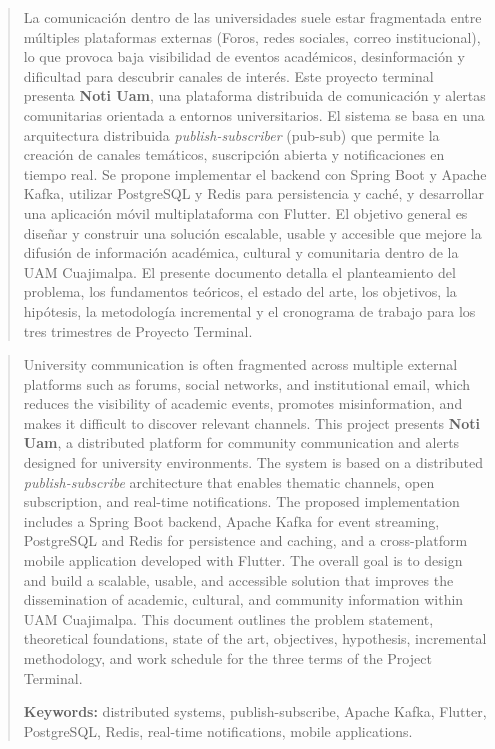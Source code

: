 \documentclass[11pt,spanish]{article}
\begin{document}
\pagestyle{empty}
\vfill
\begin{abstract}
La comunicación dentro de las universidades suele estar fragmentada entre múltiples plataformas externas 
(Foros, redes sociales, correo institucional), lo que provoca baja visibilidad de eventos académicos, 
desinformación y dificultad para descubrir canales de interés. Este proyecto terminal presenta \textbf{Noti Uam}, 
una plataforma distribuida de comunicación y alertas comunitarias orientada a entornos universitarios.
 El sistema se basa en una arquitectura distribuida \textit{publish-subscriber} (pub-sub) que permite la creación de 
 canales temáticos, suscripción abierta y notificaciones en tiempo real. Se propone implementar el backend con 
 Spring Boot y Apache Kafka, utilizar PostgreSQL y Redis para persistencia y caché, y desarrollar una aplicación 
 móvil multiplataforma con Flutter. El objetivo general es diseñar y construir una solución escalable, usable y 
 accesible que mejore la difusión de información académica, cultural y comunitaria dentro de la UAM Cuajimalpa. 
 El presente documento detalla el planteamiento del problema, los fundamentos teóricos, el estado del arte, los objetivos, 
 la hipótesis, la metodología incremental y el cronograma de trabajo para los tres trimestres de Proyecto Terminal.
\end{abstract}

\vskip 3cm

\renewcommand{\abstractname}{Abstract}
\begin{abstract}
University communication is often fragmented across multiple external platforms such as forums, social networks, and institutional email, which reduces the visibility of academic events, promotes misinformation, and makes it difficult to discover relevant channels. This project presents \textbf{Noti Uam}, a distributed platform for community communication and alerts designed for university environments. The system is based on a distributed \textit{publish-subscribe} architecture that enables thematic channels, open subscription, and real-time notifications. The proposed implementation includes a Spring Boot backend, Apache Kafka for event streaming, PostgreSQL and Redis for persistence and caching, and a cross-platform mobile application developed with Flutter. The overall goal is to design and build a scalable, usable, and accessible solution that improves the dissemination of academic, cultural, and community information within UAM Cuajimalpa. This document outlines the problem statement, theoretical foundations, state of the art, objectives, hypothesis, incremental methodology, and work schedule for the three terms of the Project Terminal.\par
\medskip
\noindent\textbf{Keywords:} distributed systems, publish-subscribe, Apache Kafka, Flutter, PostgreSQL, Redis, real-time notifications, mobile applications.
\end{abstract}
\end{document}
